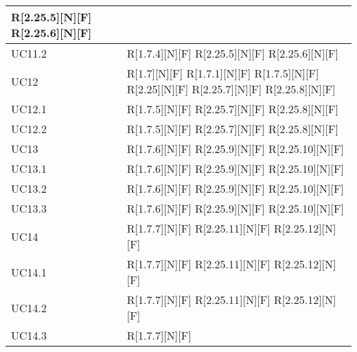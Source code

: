\begin{longtable}{X | X}
R[2.25.5][N][F] \newline
R[2.25.6][N][F]  \\
\hline
UC11.2 & R[1.7.4][N][F] \newline
R[2.25.5][N][F] \newline
R[2.25.6][N][F]  \\
\hline
UC12 & R[1.7][N][F] \newline
R[1.7.1][N][F] \newline
R[1.7.5][N][F] \newline
R[2.25][N][F] \newline
R[2.25.7][N][F] \newline
R[2.25.8][N][F]  \\
\hline
UC12.1 & R[1.7.5][N][F] \newline
R[2.25.7][N][F] \newline
R[2.25.8][N][F]  \\
\hline
UC12.2 & R[1.7.5][N][F] \newline
R[2.25.7][N][F] \newline
R[2.25.8][N][F]  \\
\hline
UC13 & R[1.7.6][N][F] \newline
R[2.25.9][N][F] \newline
R[2.25.10][N][F]  \\
\hline
UC13.1 & R[1.7.6][N][F] \newline
R[2.25.9][N][F] \newline
R[2.25.10][N][F]  \\
\hline
UC13.2 & R[1.7.6][N][F] \newline
R[2.25.9][N][F] \newline
R[2.25.10][N][F]  \\
\hline
UC13.3 & R[1.7.6][N][F] \newline
R[2.25.9][N][F] \newline
R[2.25.10][N][F]  \\
\hline
UC14 & R[1.7.7][N][F] \newline
R[2.25.11][N][F] \newline
R[2.25.12][N][F]  \\
\hline
UC14.1 & R[1.7.7][N][F] \newline
R[2.25.11][N][F] \newline
R[2.25.12][N][F]  \\
\hline
UC14.2 & R[1.7.7][N][F] \newline
R[2.25.11][N][F] \newline
R[2.25.12][N][F]  \\
\hline
UC14.3 & R[1.7.7][N][F] \newline

\end{longtable}

